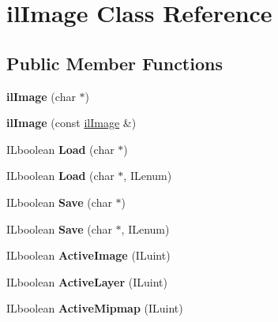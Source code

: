 \hypertarget{classil_image}{\section{il\+Image Class Reference}
\label{classil_image}
}
\subsection*{Public Member Functions}
\begin{DoxyCompactItemize}
\item 
\hypertarget{classil_image_a54b3bdcd19535b51f46ae196bd324aa2}{{\bfseries il\+Image} (char $\ast$)}\label{classil_image_a54b3bdcd19535b51f46ae196bd324aa2}

\item 
\hypertarget{classil_image_a8835ff2785a1287caad2ffd121017cdc}{{\bfseries il\+Image} (const \hyperlink{classil_image}{il\+Image} \&)}\label{classil_image_a8835ff2785a1287caad2ffd121017cdc}

\item 
\hypertarget{classil_image_a0c56a726c4dc8d17a4bec5115834f305}{I\+Lboolean {\bfseries Load} (char $\ast$)}\label{classil_image_a0c56a726c4dc8d17a4bec5115834f305}

\item 
\hypertarget{classil_image_a6eef4d2d15228b248b56ac03d70c97cb}{I\+Lboolean {\bfseries Load} (char $\ast$, I\+Lenum)}\label{classil_image_a6eef4d2d15228b248b56ac03d70c97cb}

\item 
\hypertarget{classil_image_af962d795b6f8c82be013ec511720ddf6}{I\+Lboolean {\bfseries Save} (char $\ast$)}\label{classil_image_af962d795b6f8c82be013ec511720ddf6}

\item 
\hypertarget{classil_image_a2f3e826c18ca6820a473e626134cd4f4}{I\+Lboolean {\bfseries Save} (char $\ast$, I\+Lenum)}\label{classil_image_a2f3e826c18ca6820a473e626134cd4f4}

\item 
\hypertarget{classil_image_a5635938ffee8a3856811e5c51658a0f8}{I\+Lboolean {\bfseries Active\+Image} (I\+Luint)}\label{classil_image_a5635938ffee8a3856811e5c51658a0f8}

\item 
\hypertarget{classil_image_a52781721e97af4840259699518ff63d8}{I\+Lboolean {\bfseries Active\+Layer} (I\+Luint)}\label{classil_image_a52781721e97af4840259699518ff63d8}

\item 
\hypertarget{classil_image_a5ee7041f179112a50218964e3d8aab81}{I\+Lboolean {\bfseries Active\+Mipmap} (I\+Luint)}\label{classil_image_a5ee7041f179112a50218964e3d8aab81}


\end{DoxyCompactItemize}
